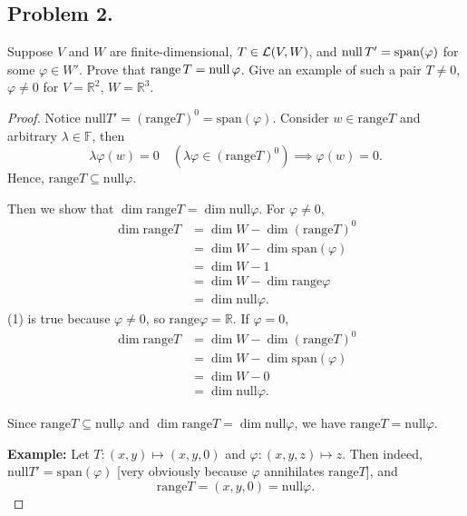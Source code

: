 \documentclass{article}
\begin{document}
\subsection*{Problem 2.}
Suppose $V$ and $W$ are finite-dimensional, $T\in {\cal L}(V,W)$, and 
${\rm null}\, T' = {\rm span} (\varphi)$ for some $\varphi\in W'$. 
Prove that ${\rm range}\, T = {\rm null} \, \varphi$.  
Give an example of such a pair $T\neq 0$, $\varphi\neq 0$ for $V=\mathbb{R}^2$, $W=\mathbb{R}^3$.
\begin{proof}
    Notice $\mathrm{null} T' = (\mathrm{range} T)^0 = \mathrm{span}(\varphi)$. 
    Consider $w\in\mathrm{range}T$ and arbitrary $\lambda\in\mathbb{F}$, then 
    $$\lambda \varphi(w) = 0 \quad (\lambda\varphi \in (\mathrm{range}T)^0) \implies \varphi(w)=0.$$
    Hence, $\mathrm{range}T\subseteq\mathrm{null}\varphi$.

    Then we show that $\dim\mathrm{range}T=\dim\mathrm{null}\varphi$. For $\varphi\neq 0$,
    \begin{align}
        \dim \mathrm{range}T & = \dim W - \dim (\mathrm{range}T)^0 \nonumber \\
        & = \dim W - \dim \mathrm{span}(\varphi) \nonumber \\
        & = \dim W - 1 \nonumber \\
        & = \dim W - \dim \mathrm{range}\varphi \\
        & = \dim \mathrm{null}\varphi. \nonumber
    \end{align}
    (1) is true because $\varphi \neq 0$, so $\mathrm{range}\varphi =\mathbb{R}$.
    If $\varphi = 0$,
    \begin{align}
        \dim \mathrm{range}T & = \dim W - \dim (\mathrm{range}T)^0 \nonumber \\
        & = \dim W - \dim \mathrm{span}(\varphi) \nonumber \\
        & = \dim W - 0 \nonumber \\
        & = \dim \mathrm{null}\varphi. \nonumber
    \end{align}

    Since $\mathrm{range}T\subseteq\mathrm{null}\varphi$ and 
    $\dim\mathrm{range}T=\dim\mathrm{null}\varphi$, we have
    $\mathrm{range}T=\mathrm{null}\varphi$.

    \textbf{Example:} Let $T:(x,y)\mapsto (x,y,0)$ and $\varphi:(x,y,z)\mapsto z$. Then indeed, 
    $\mathrm{null}T'=\mathrm{span}(\varphi)$ [very obviously because $\varphi$ annihilates $\mathrm{range}T$], and 
    $$\mathrm{range}T=(x,y,0)=\mathrm{null}\varphi.$$
\end{proof}
\end{document}
